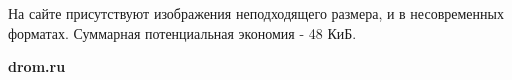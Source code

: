 \noindent
\begin{minipage}{\linewidth}
\end{minipage}
\bigskip

На сайте присутствуют изображения неподходящего размера, и в несовременных форматах. Суммарная потенциальная экономия - 48 КиБ.

\textbf{drom.ru}
\bigskip

\noindent
\begin{minipage}{\linewidth}
\end{minipage}
\bigskip

